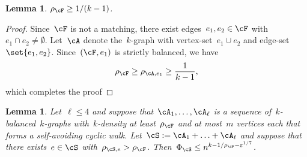 \documentclass[11pt]{amsart}
\newcommand{\eps}{\varepsilon}
\newtheorem{lemma}[algocf]{Lemma}
\theoremstyle{definition}
\numberwithin{equation}{section}
\begin{document}
	\begin{lemma}\label{lemma: lower bound density}
		$\rho_\cF\geq 1/(k-1)$.
	\end{lemma}
	\begin{proof}
		Since~$\cF$ is not a matching, there exist edges~$e_1,e_2\in\cF$ with~$e_1\cap e_2\neq\emptyset$.
		Let~$\cA$ denote the~$k$-graph with vertex-set~$e_1\cup e_2$ and edge-set~$\set{e_1,e_2}$.
		Since~$(\cF,e_1)$ is strictly balanced, we have
		\begin{equation*}
			\rho_\cF
			\geq\rho_{\cA,e_1}
			\geq \frac{1}{k-1},
		\end{equation*}
		which completes the proof
	\end{proof}
	
	\begin{lemma}\label{lemma: few cyclic walks general}
		Let~$\ell\leq 4$ and suppose that~$\cA_1,\ldots,\cA_\ell$ is a sequence of~$k$-balanced~$k$-graphs with~$k$-density at least~$\rho_\cF$ and at most~$m$ vertices each that forms a self-avoiding cyclic walk.
		Let~$\cS:=\cA_1+\ldots+\cA_\ell$ and suppose that there exists~$e\in\cS$ with~$\rho_{\cS,e}>\rho_\cF$.
		Then~$\Phi_{\cS}\leq n^{k-1/\rho_\cF-\eps^{1/7}}$.
	\end{lemma}
\end{document}
